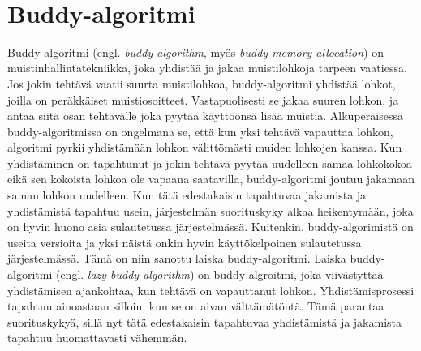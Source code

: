 ~\\

\section{Buddy-algoritmi}

Buddy-algoritmi (engl. \textit{buddy algorithm}, myös \textit{buddy memory allocation}) on muistinhallintatekniikka, joka yhdistää ja jakaa muistilohkoja tarpeen vaatiessa. Jos jokin tehtävä vaatii suurta muistilohkoa, buddy-algoritmi yhdistää lohkot, joilla on peräkkäiset muistiosoitteet. Vastapuolisesti se jakaa suuren lohkon, ja antaa siitä osan tehtävälle joka pyytää käyttöönsä lisää muistia. Alkuperäisessä buddy-algoritmissa on ongelmana se, että kun yksi tehtävä vapauttaa lohkon, algoritmi pyrkii yhdistämään lohkon välittömästi muiden lohkojen kanssa. Kun yhdistäminen on tapahtunut ja jokin tehtävä pyytää uudelleen samaa lohkokokoa eikä sen kokoista lohkoa ole vapaana saatavilla, buddy-algoritmi joutuu jakamaan saman lohkon uudelleen. Kun tätä edestakaisin tapahtuvaa jakamista ja yhdistämistä tapahtuu usein, järjestelmän suorituskyky alkaa heikentymään, joka on hyvin huono asia sulautetussa järjestelmässä. Kuitenkin, buddy-algorimistä on useita versioita ja yksi näistä onkin hyvin käyttökelpoinen sulautetussa järjestelmässä. Tämä on niin sanottu laiska buddy-algoritmi. Laiska buddy-algoritmi (engl. \textit{lazy buddy algorithm}) on buddy-algroitmi, joka viivästyttää yhdistämisen ajankohtaa, kun tehtävä on vapauttanut lohkon. Yhdistämisprosessi tapahtuu ainoastaan silloin, kun se on aivan välttämätöntä. Tämä parantaa suorituskykyä, sillä nyt tätä edestakaisin tapahtuvaa yhdistämistä ja jakamista tapahtuu huomattavasti vähemmän.\cite{soeosmm@2009}

